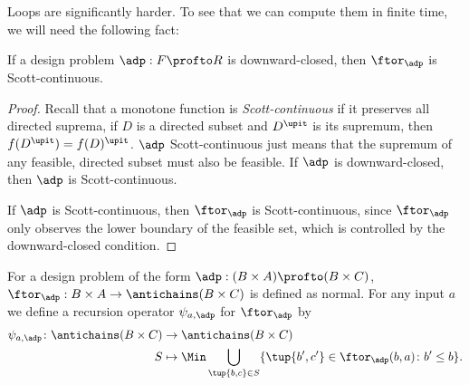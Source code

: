 Loops are significantly harder.
To see that we can compute them in finite time, we will need the following fact:
\begin{lemma}
    If a design problem $\adp : F \profto R$ is downward-closed, then $\ftor_\adp$ is Scott-continuous.
\end{lemma}

\begin{proof}
    Recall that a monotone function is \emph{Scott-continuous} if it preserves all directed suprema, \ie  if $D$ is a directed subset and $D^\upit$ is its supremum, then $f(D^\upit) = f(D)^\upit$.
    $\adp$ Scott-continuous just means that the supremum of any feasible, directed subset must also be feasible.
    If $\adp$ is downward-closed, then $\adp$ is Scott-continuous.


    If $\adp$ is Scott-continuous, then $\ftor_\adp$ is Scott-continuous, since $\ftor_\adp$ only observes the lower boundary of the feasible set, which is controlled by the downward-closed condition.
\end{proof}

For a design problem of the form $\adp : (B \times A) \profto (B \times C)$, $\ftor_\adp : B \times A \to \antichains (B \times C)$ is defined as normal.
For any input $a$ we define a recursion operator $\psi_{a,\adp}$ for $\ftor_\adp$ by
\begin{equation}
    \begin{aligned}
        \psi_{a,\adp} \colon \antichains (B \times C) & \to \antichains (B \times C)                                                                   \\
        S                                             & \mapsto \Min \bigcup_{\tup{b,c} \in S} \{ \tup{b',c'} \in \ftor_\adp(b,a) \colon b' \leq b \}.
    \end{aligned}
\end{equation}

